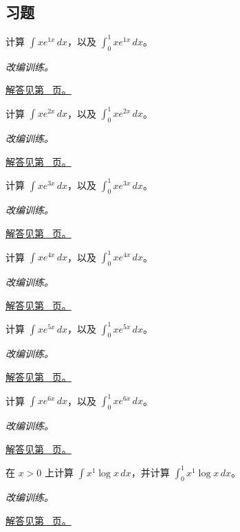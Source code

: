 \documentclass[UTF8,12pt,a4paper,fontset=fandol]{ctexart}
\begin{document}
\subsection{习题}
\begin{example}[一次多项式乘指数]\label{ex:c13q1}
计算 $\displaystyle\int xe^{1x}\,dx$，以及 $\displaystyle\int_0^1xe^{1x}\,dx$。
\par\textit{改编训练。}\par\hyperref[ans:c13q1]{解答见第~\pageref{ans:c13q1} 页。}
\end{example}
\begin{example}[一次多项式乘指数]\label{ex:c13q2}
计算 $\displaystyle\int xe^{2x}\,dx$，以及 $\displaystyle\int_0^1xe^{2x}\,dx$。
\par\textit{改编训练。}\par\hyperref[ans:c13q2]{解答见第~\pageref{ans:c13q2} 页。}
\end{example}
\begin{example}[一次多项式乘指数]\label{ex:c13q3}
计算 $\displaystyle\int xe^{3x}\,dx$，以及 $\displaystyle\int_0^1xe^{3x}\,dx$。
\par\textit{改编训练。}\par\hyperref[ans:c13q3]{解答见第~\pageref{ans:c13q3} 页。}
\end{example}
\begin{example}[一次多项式乘指数]\label{ex:c13q4}
计算 $\displaystyle\int xe^{4x}\,dx$，以及 $\displaystyle\int_0^1xe^{4x}\,dx$。
\par\textit{改编训练。}\par\hyperref[ans:c13q4]{解答见第~\pageref{ans:c13q4} 页。}
\end{example}
\begin{example}[一次多项式乘指数]\label{ex:c13q5}
计算 $\displaystyle\int xe^{5x}\,dx$，以及 $\displaystyle\int_0^1xe^{5x}\,dx$。
\par\textit{改编训练。}\par\hyperref[ans:c13q5]{解答见第~\pageref{ans:c13q5} 页。}
\end{example}
\begin{example}[一次多项式乘指数]\label{ex:c13q6}
计算 $\displaystyle\int xe^{6x}\,dx$，以及 $\displaystyle\int_0^1xe^{6x}\,dx$。
\par\textit{改编训练。}\par\hyperref[ans:c13q6]{解答见第~\pageref{ans:c13q6} 页。}
\end{example}
\begin{example}[幂函数乘对数]\label{ex:c13q7}
在 $x>0$ 上计算 $\displaystyle\int x^{1}\log x\,dx$，并计算 $\displaystyle\int_0^1x^{1}\log x\,dx$。
\par\textit{改编训练。}\par\hyperref[ans:c13q7]{解答见第~\pageref{ans:c13q7} 页。}
\end{example}
\end{document}

